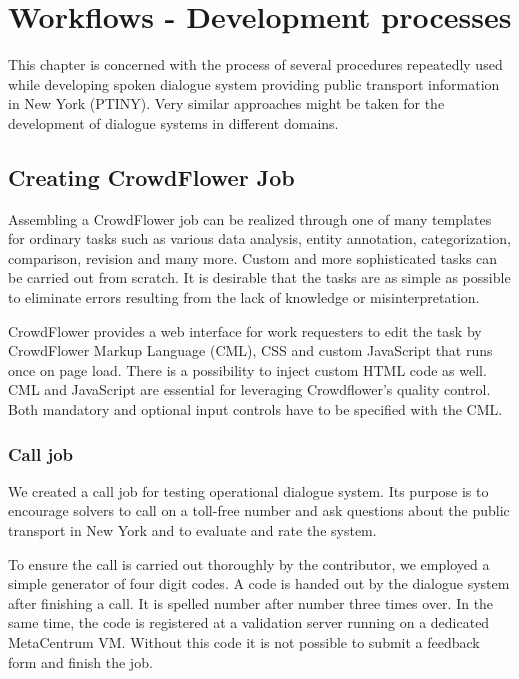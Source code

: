 \chapter{Workflows - Development processes} \label{ch:workflow}

This chapter is concerned with the process of several procedures repeatedly used while developing spoken dialogue system providing public transport information in New York (PTINY).
Very similar approaches might be taken for the development of dialogue systems in different domains.

\section{Creating CrowdFlower Job}

Assembling a CrowdFlower job can be realized through one of many templates for ordinary tasks such as various data analysis, entity annotation, categorization, comparison, revision and many more.%
Custom and more sophisticated tasks can be carried out from scratch.
It is desirable that the tasks are as simple as possible to eliminate errors resulting from the lack of knowledge or misinterpretation.

CrowdFlower provides a web interface for work requesters to edit the task by CrowdFlower Markup Language (CML), CSS and custom JavaScript that runs once on page load.
There is a possibility to inject custom HTML code as well.
CML and JavaScript are essential for leveraging Crowdflower's quality control.
Both mandatory and optional input controls have to be specified with the CML.

\subsection{Call job}

We created a call job for testing operational dialogue system.
Its purpose is to encourage solvers to call on a toll-free number and ask questions about the public transport in New York and to evaluate and rate the system.

To ensure the call is carried out thoroughly by the contributor, we employed a simple generator of four digit codes.
A code is handed out by the dialogue system after finishing a call.
It is spelled number after number three times over.
In the same time, the code is registered at a validation server running on a dedicated MetaCentrum VM.
Without this code it is not possible to submit a feedback form and finish the job.

